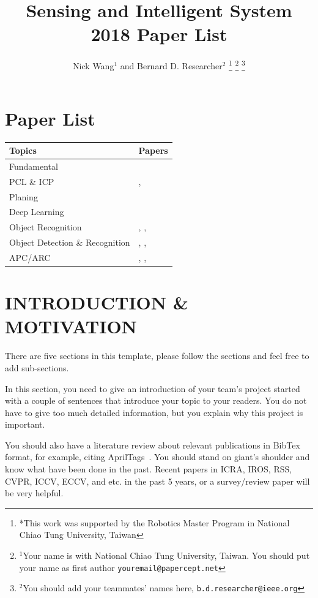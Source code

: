 \documentclass[letterpaper, 10 pt, conference]{ieeeconf}  %
\title{\LARGE \bf
Sensing and Intelligent System 2018 Paper List
}
\author{Nick Wang$^{1}$ and Bernard D. Researcher$^{2}$%
\thanks{*This work was supported by the Robotics Master Program in National Chiao Tung University, Taiwan}%
\thanks{$^{1}$Your name is with National Chiao Tung University, Taiwan. You should put your name as first author
        {\tt\small youremail@papercept.net}}%
\thanks{$^{2}$You should add your teammates' names here,
        {\tt\small b.d.researcher@ieee.org}}%
}
\begin{document}
\maketitle
\thispagestyle{empty}
\pagestyle{empty}

\section{Paper List}

\begin{tabular}{ll}
\hline
Topics & Papers \\
\hline 
Fundamental & \cite{olson2011apriltag} \\
PCL \& ICP & \cite{rusu20113d}, \cite{pomerleau2013comparing} \\
Planing & \cite{kuffner2000rrt} \\
Deep Learning & \cite{lecun2015deep} \\
Object Recognition & \cite{krizhevsky2012imagenet}, \cite{simonyan2014very}, \cite{he2016deep} \\
Object Detection \& Recognition & \cite{long2015fully} \cite{ren2015faster}, \cite{redmon2017yolo9000}, \cite{liu2016ssd} \\
APC/ARC & \cite{zeng2016multi}, \cite{zeng2018robotic}, \cite{hernandez2016team} \\
\hline
\end{tabular}

\section{INTRODUCTION \& MOTIVATION}

There are five sections in this template, please follow the sections and feel free to add sub-sections. 

In this section, you need to give an introduction of your team's project started with a couple of sentences that introduce your topic to your readers. You do not have to give too much detailed information, but you explain why this project is important.

You should also have a literature review about relevant publications in BibTex format, for example, citing AprilTags~\cite{Olson09icra}. You should stand on giant's shoulder and know what have been done in the past. Recent papers in ICRA, IROS, RSS, CVPR, ICCV, ECCV, and etc. in the past 5 years, or a survey/review paper will be very helpful.
\end{document}
